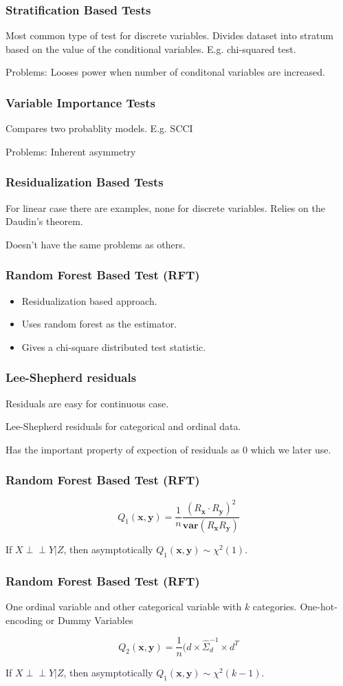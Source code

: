 \documentclass{beamer}
\def\ci{\perp\!\!\!\!\!\perp}
\begin{document}
\begin{frame}
	\frametitle{Stratification Based Tests}
	Most common type of test for discrete variables.
	Divides dataset into stratum based on the value of the conditional
	variables. E.g. chi-squared test.

	Problems: Looses power when number of conditonal variables are increased.
\end{frame}

\begin{frame}
	\frametitle{Variable Importance Tests}
	Compares two probablity models. E.g. SCCI

	Problems: Inherent asymmetry
\end{frame}

\begin{frame}
	\frametitle{Residualization Based Tests}
	For linear case there are examples, none for discrete variables.
	Relies on the Daudin's theorem.

	Doesn't have the same problems as others.
\end{frame}

\begin{frame}
	\frametitle{Random Forest Based Test (RFT)}
	\begin{itemize}
		\item Residualization based approach.
		\item Uses random forest as the estimator.
		\item Gives a chi-square distributed test statistic.
	\end{itemize}
\end{frame}

\begin{frame}
	\frametitle{Lee-Shepherd residuals}
	Residuals are easy for continuous case.

	Lee-Shepherd residuals for categorical and ordinal data.

	Has the important property of expection of residuals as $ 0 $ which 
	we later use.
\end{frame}

\begin{frame}
	\frametitle{Random Forest Based Test (RFT)}
	$$ Q_1(\bm{x}, \bm{y}) = \frac{1}{n} \frac{(R_{\bm{x}} \cdot R_{\bm{y}})^2}{\bm{var}(R_{\bm{x}} R_{\bm{y}})} $$

	If $ X \ci Y | Z $, then asymptotically $ Q_1(\bm{x}, \bm{y}) \sim \chi^2(1) $.
\end{frame}

\begin{frame}
	\frametitle{Random Forest Based Test (RFT)}
	One ordinal variable and other categorical variable with $ k $ categories.
	One-hot-encoding or Dummy Variables


	$$ Q_2(\bm{x}, \bm{y}) = \frac{1}{n} (d \times \hat{\Sigma}_d^{-1} \times d^T $$

	If $ X \ci Y | Z $, then asymptotically $ Q_1(\bm{x}, \bm{y}) \sim \chi^2(k-1) $.
\end{frame}
\end{document}
